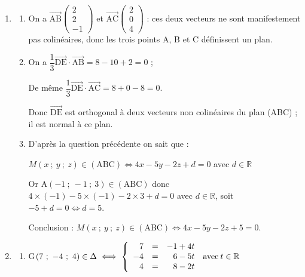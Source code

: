 \documentclass[10pt]{article}
\providecommand{\R}{\mathbb{R}}
\providecommand{\vect}[1]{\overrightarrow{#1}}
\begin{document}
\begin{enumerate}
\begin{enumerate}
		\item 
		F$(1,36~;~-1,7~;~-0,7) \in\Delta' \iff \left\{\begin{array}{l c l}
1,36&=&\phantom{-}4t\\
-1,7&=&-5t \quad\text{avec}\: t \in \R\\
-0,7&=& -2t
\end{array}\right.$

Les deux premières équations donnent $t = 0,34$ et la dernière $t = 0,35$. \\
Donc F $\notin \Delta$.
	\end{enumerate}	
\item
	\begin{enumerate}
		\item 
		On a $\vect{\text{AB}}\begin{pmatrix}2\\2\\-1\end{pmatrix}$ et $\vect{\text{AC}}\begin{pmatrix}2\\0\\4\end{pmatrix}$ : ces deux vecteurs ne sont manifestement pas colinéaires, donc les trois points A, B et C définissent un plan.
		\item 
On a $\dfrac13\vect{\text{DE}} \cdot \vect{\text{AB}} = 8 - 10 + 2 = 0$ ;

De même $\dfrac13\vect{\text{DE}} \cdot \vect{\text{AC}} = 8 + 0 - 8 = 0$.

Donc $\vect{\text{DE}}$ est orthogonal à deux vecteurs non colinéaires du plan (ABC) ; il est normal à ce plan.

		\item 
		
D'après la question précédente on sait que :

$M(x~;~y~;~z) \in (\text{ABC}) \iff 4x - 5y - 2z + d = 0$ avec $d \in \R$

Or A$(- 1~;~-1~;~3) \in (\text{ABC})$ donc $4\times (-1) - 5\times (-1)  - 2\times 3  + d = 0$ avec $d \in \R$, soit $- 5 + d = 0 \iff d = 5$.

Conclusion : $M(x~;~y~;~z) \in (\text{ABC}) \iff 4x - 5y - 2z + 5 = 0$.
	\end{enumerate}
\item
	\begin{enumerate}
		\item 
		G$(7~;~-4~;~4) \in \Delta \iff \left\{\begin{array}{r c l}
7 &=& -1 + 4t\\
-4 &=& \phantom{-}6 - 5t \quad\text{avec}\: t \in \R\\
4 &=& \phantom{-}8 - 2t
\end{array}\right.$


\end{enumerate}
\end{enumerate}
\end{document}
